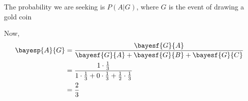 \begin{solution}[\halfpage]
    The probability we are seeking is $P(A \vert G)$, where $G$ is the event of drawing
    a gold coin
    
    Now, 
    \begin{align}
       \bayesp{A}{G} &= \dfrac{\bayesf{G}{A}}{\bayesf{G}{A} + \bayesf{G}{B} + \bayesf{G}{C}} \\
          &= \dfrac{1\cdot\frac{1}{3}}{1\cdot\frac{1}{3} + 0\cdot\frac{1}{3} 
          + \frac{1}{2}\cdot\frac{1}{3}} \\
          &= \dfrac{2}{3}
    \end{align}
\end{solution}
